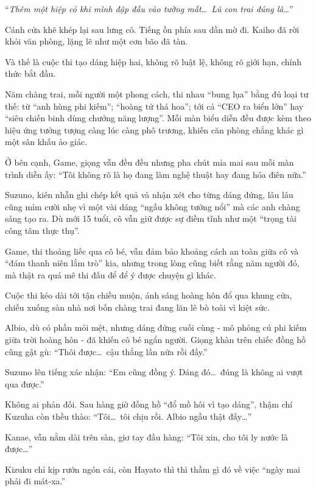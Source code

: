 \documentclass[../main.tex]{subfiles}
\begin{document}
``\textit{Thêm một hiệp có khi mình đập đầu vào tường mất\dots\ Lũ con trai đúng là\dots}''

Cánh cửa khẽ khép lại sau lưng cô. Tiếng ồn phía sau dần mờ đi. Kaiho đã rời khỏi văn phòng, lặng lẽ như một cơn bão đã tàn.

\il

Và thế là cuộc thi tạo dáng hiệp hai, không rõ luật lệ, không rõ giới hạn, chính thức bắt đầu.

Năm chàng trai, mỗi người một phong cách, thi nhau ``bung lụa'' bằng đủ loại tư thế: từ ``anh hùng phi kiếm''; ``hoàng tử thả hoa''; tới cả ``CEO ra biển lớn'' hay ``siêu chiến binh dùng chưởng năng lượng''. Mỗi màn biểu diễn đều được kèm theo hiệu ứng tưởng tượng càng lúc càng phô trương, khiến căn phòng chẳng khác gì một sân khấu ảo giác.

Ở bên cạnh, Game, giọng vẫn đều đều nhưng pha chút mỉa mai sau mỗi màn trình diễn ấy: ``Tôi không rõ là họ đang làm nghệ thuật hay đang hóa điên nữa.''

Suzuno, kiên nhẫn ghi chép kết quả và nhận xét cho từng dáng đứng, lâu lâu cũng mỉm cười nhẹ vì một vài dáng ``ngầu không tưởng nổi'' mà các anh chàng sáng tạo ra. Dù mới 15 tuổi, cô vẫn giữ được sự điềm tĩnh như một ``trọng tài công tâm thực thụ''.

Game, thi thoảng liếc qua cô bé, vẫn đảm bảo khoảng cách an toàn giữa cô và ``đám thanh niên lắm trò'' kia, nhưng trong lòng cũng biết rằng năm người đó, mà thật ra quá mê thi đấu để để ý được chuyện gì khác.

Cuộc thi kéo dài tới tận chiều muộn, ánh sáng hoàng hôn đổ qua khung cửa, chiếu xuống sàn nhà nơi bốn chàng trai đang lăn lê bò toài vì kiệt sức.

Albio, dù có phần mỏi mệt, nhưng dáng đứng cuối cùng - mô phỏng cú phi kiếm giữa trời hoàng hôn - đã khiến cô bé ngẩn người. Giọng khàn trên chiếc đồng hồ cũng gật gù: ``Thôi được\dots\ cậu thắng lần nữa rồi đấy.''

Suzuno lên tiếng xác nhận: ``Em cũng đồng ý. Dáng đó\dots\ đúng là không ai vượt qua được.''

Không ai phản đối. Sau hàng giờ đồng hồ ``đổ mồ hôi vì tạo dáng'', thậm chí Kuzuha còn thều thào: ``Tôi\dots\ tôi chịu rồi. Albio ngầu thật đấy\dots''

Kanae, vẫn nằm dài trên sàn, giơ tay đầu hàng: ``Tôi xin, cho tôi ly nước là được\dots''

Kizuku chỉ kịp rướn ngón cái, còn Hayato thì thì thầm gì đó về việc ``ngày mai phải đi mát-xa.''
\end{document}
